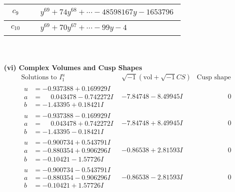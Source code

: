 \documentclass[1p]{elsarticle_modified}
\theoremstyle{definition}
\newcommand{\I}{\sqrt{-1}}
\begin{document}
\begin{tabular}{m{50pt}|m{274pt}}
\hline $$\begin{aligned}c_{9}\end{aligned}$$&$\begin{aligned}
&y^{69}+74 y^{68}+\cdots-48598167 y-1653796
\end{aligned}$\\
\hline $$\begin{aligned}c_{10}\end{aligned}$$&$\begin{aligned}
&y^{69}+70 y^{67}+\cdots-99 y-4
\end{aligned}$\\
\hline
\end{tabular}\\~\\
\newpage\flushleft \textbf{(vi) Complex Volumes and Cusp Shapes}
$$\begin{array}{c|c|c}  
\text{Solutions to }I^u_{1}& \I (\text{vol} + \sqrt{-1}CS) & \text{Cusp shape}\\
 \hline 
\begin{aligned}
u &= -0.937388 + 0.169929 I \\
a &= \phantom{-}0.043478 - 0.742272 I \\
b &= -1.43395 + 0.18421 I\end{aligned}
 & -7.84748 - 8.49945 I & \phantom{-0.000000 } 0 \\ \hline\begin{aligned}
u &= -0.937388 - 0.169929 I \\
a &= \phantom{-}0.043478 + 0.742272 I \\
b &= -1.43395 - 0.18421 I\end{aligned}
 & -7.84748 + 8.49945 I & \phantom{-0.000000 } 0 \\ \hline\begin{aligned}
u &= -0.900734 + 0.543791 I \\
a &= -0.880354 + 0.906296 I \\
b &= -0.10421 - 1.57726 I\end{aligned}
 & -0.86538 + 2.81593 I & \phantom{-0.000000 } 0 \\ \hline\begin{aligned}
u &= -0.900734 - 0.543791 I \\
a &= -0.880354 - 0.906296 I \\
b &= -0.10421 + 1.57726 I\end{aligned}
 & -0.86538 - 2.81593 I & \phantom{-0.000000 } 0 \\ \hline\begin{aligned}

\end{aligned}
\end{array}$$
\end{document}
